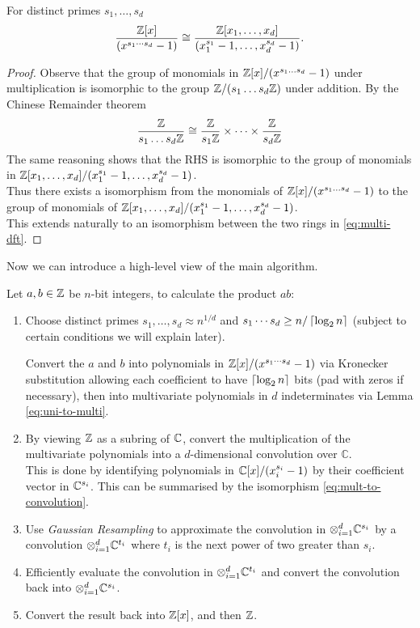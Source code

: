 \begin{lemma}\label{eq:uni-to-multi}
    For distinct primes $s_1, \ldots, s_d$
    \begin{equation}\label{eq:multi-dft}
        \frac{{\mathbb Z}[x]}{(x^{s_1\cdots s_d} - 1)} \cong \frac{{\mathbb Z}[x_1, \ldots, x_d]}{(x_1^{s_1} - 1, \ldots, x_d^{s_d} - 1)}.
    \end{equation}
\end{lemma}

\begin{proof}
    Observe that the group of monomials in ${\mathbb Z}[x]/(x^{s_1\ldots s_d} - 1)$ under multiplication is isomorphic to the group ${\mathbb Z}/(s_1 \ldots s_d{\mathbb Z})$ under addition. By the Chinese Remainder theorem
    \[
        \frac{{\mathbb Z}}{s_1\ldots s_d {\mathbb Z}} \cong \frac{{\mathbb Z}}{s_1 {\mathbb Z}} \times \cdots \times \frac{{\mathbb Z}}{s_d {\mathbb Z}}
    \]
    The same reasoning shows that the RHS is isomorphic to the group of monomials in ${\mathbb Z}[x_1, \ldots, x_d]/(x_1^{s_1} - 1, \ldots, x_d^{s_d} - 1)$.\\
    Thus there exists a isomorphism from the monomials of ${\mathbb Z}[x]/(x^{s_1\ldots s_d} - 1)$ to the group of monomials of ${\mathbb Z}[x_1, \ldots, x_d]/(x_1^{s_1} - 1, \ldots, x_d^{s_d} - 1)$.\\
    This extends naturally to an isomorphism between the two rings in \eqref{eq:multi-dft}.
\end{proof}

Now we can introduce a high-level view of the main algorithm.

Let $a, b \in {\mathbb Z}$ be $n$-bit integers, to calculate the product $ab$:

\begin{enumerate}
    \item  Choose distinct primes $s_1, \ldots, s_d \approx n^{1/d}$ and $s_1\cdots s_d \ge n/\left \lceil \log_2 n \right \rceil$ (subject to certain conditions we will explain later).

        Convert the $a$ and $b$ into polynomials in ${\mathbb Z}[x]/(x^{s_1\cdots s_d} - 1)$ via Kronecker substitution allowing each coefficient to have $\left \lceil \log_2 n \right \rceil$ bits (pad with zeros if necessary), then into multivariate polynomials in $d$ indeterminates via Lemma \ref{eq:uni-to-multi}.
    \item By viewing ${\mathbb Z}$ as a subring of ${\mathbb C}$, convert the multiplication of the multivariate polynomials into a $d$-dimensional convolution over $\mathbb{C}$.\\
        This is done by identifying polynomials in ${\mathbb C}[x]/(x_i^{s_i} - 1)$ by their coefficient vector in ${\mathbb C}^{s_i}$. This can be summarised by the isomorphism \ref{eq:mult-to-convolution}.
    \item Use \emph{Gaussian Resampling} to approximate the convolution in $\otimes_{i=1}^d {\mathbb C}^{s_i}$ by a convolution $\otimes_{i=1}^d {\mathbb C}^{t_i}$ where $t_i$ is the next power of two greater than $s_i$.
    \item Efficiently evaluate the convolution in $\otimes_{i=1}^d {\mathbb C}^{t_i}$ and convert the convolution back into $\otimes_{i=1}^d {\mathbb C}^{s_i}$.
    \item Convert the result back into ${\mathbb Z}[x]$, and then ${\mathbb Z}$.
\end{enumerate}


